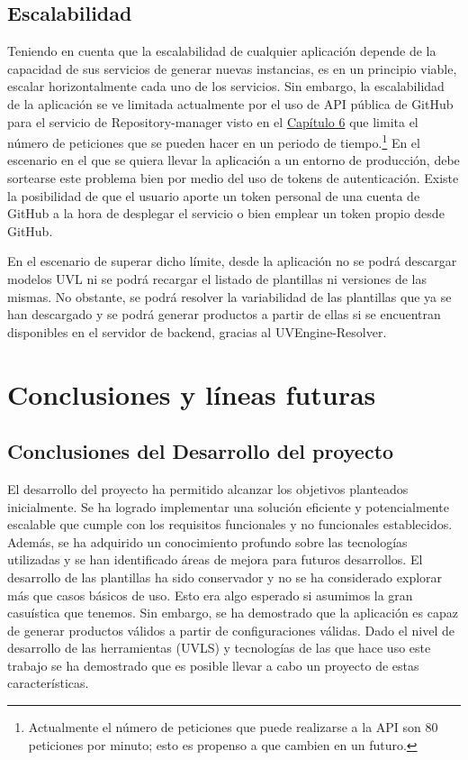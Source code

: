 \documentclass[12pt, a4paper, twoside]{article}
\begin{document}
\subsection{Escalabilidad}
Teniendo en cuenta que la escalabilidad de cualquier aplicación depende de la capacidad de sus servicios de generar nuevas instancias, es en un principio viable,
escalar horizontalmente cada uno de los servicios. Sin embargo, la escalabilidad de la aplicación se ve limitada actualmente por el uso de API pública de GitHub \cite{github_rest_api} para el servicio de Repository-manager visto en el \hyperref[sec:Desarrollo de los servicios de backend]{Capítulo 6} que limita el número de peticiones que se pueden hacer en un periodo de tiempo.\footnote{Actualmente el número de peticiones que puede realizarse a la API son 80 peticiones por minuto; esto es propenso a que cambien en un futuro.}
En el escenario en el que se quiera llevar la aplicación a un entorno de producción, debe sortearse este problema bien por medio del uso de tokens de autenticación.
Existe la posibilidad de que el usuario aporte un token personal de una cuenta de GitHub a la hora de desplegar el servicio o bien emplear un token propio desde GitHub.

En el escenario de superar dicho límite, desde la aplicación no se podrá descargar modelos UVL ni se podrá recargar el listado de plantillas ni versiones de las mismas.
No obstante, se podrá resolver la variabilidad de las plantillas que ya se han descargado y se podrá generar productos a partir de ellas si se encuentran disponibles en el servidor de backend, gracias al UVEngine-Resolver. 










\section{Conclusiones y líneas futuras}
\label{sec:Conclusiones}


\subsection{Conclusiones del Desarrollo del proyecto}
El desarrollo del proyecto ha permitido alcanzar los objetivos planteados inicialmente. Se ha logrado implementar una solución eficiente y potencialmente escalable que cumple con los requisitos funcionales y no funcionales establecidos. Además, se ha adquirido un conocimiento profundo sobre las tecnologías utilizadas y se han identificado áreas de mejora para futuros desarrollos.
El desarrollo de las plantillas ha sido conservador y no se ha considerado explorar más que casos básicos de uso. Esto era algo esperado si asumimos la gran casuística que tenemos. Sin embargo, se ha demostrado que la aplicación es capaz de generar productos válidos a partir de configuraciones válidas. Dado el nivel de desarrollo de las herramientas (UVLS) y tecnologías de las que hace uso este trabajo se ha demostrado que es posible llevar a cabo un proyecto de estas características.
\end{document}

